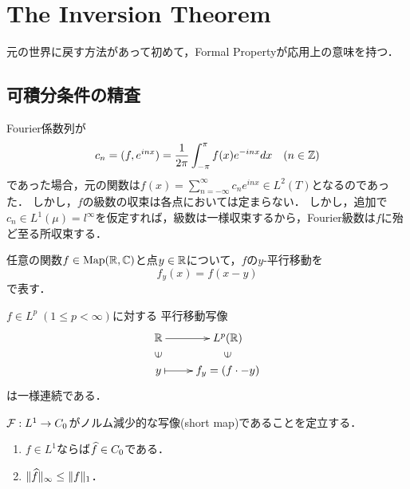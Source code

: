 \documentclass[uplatex,dvipdfmx]{jsreport}
\begin{document}
\section{The Inversion Theorem}

\begin{tcolorbox}[colframe=ForestGreen, colback=ForestGreen!10!white,breakable,colbacktitle=ForestGreen!40!white,coltitle=black,fonttitle=\bfseries\sffamily,
title=]
    元の世界に戻す方法があって初めて，Formal Propertyが応用上の意味を持つ．
\end{tcolorbox}

\subsection{可積分条件の精査}

\begin{discussion}[Fourier級数に関する逆転公式]
    Fourier係数列が
    \[c_n=(f,e^{inx})=\frac{1}{2\pi}\int^\pi_{-\pi}f(x)e^{-inx}dx\quad(n\in\mathbb{Z})\]
    であった場合，元の関数は$f(x)=\sum^\infty_{n=-\infty}c_ne^{inx}\in L^2(T)$となるのであった．
    しかし，$f$の級数の収束は各点においては定まらない．
    しかし，追加で$c_n\in L^1(\mu)=l^\infty$を仮定すれば，級数は一様収束するから，Fourier級数は$f$に殆ど至る所収束する．
\end{discussion}

\begin{notation}
    任意の関数$f\in\mathrm{Map}(\mathbb{R},\mathbb{C})$と点$y\in\mathbb{R}$について，$f$の$y$-平行移動を
    \[f_y(x)=f(x-y)\]
    で表す．
\end{notation}

\begin{lemma}
    $f\in L^p\;(1\le p<\infty)$に対する
    平行移動写像
    \[\xymatrix@R-2pc{
        \R\ar[r]&L^p(\R)\\
        \rotatebox[origin=c]{90}{$\in$}&\rotatebox[origin=c]{90}{$\in$}\\
        y\ar@{|->}[r]&f_y=(f\cdot-y)
    }\]
    は一様連続である．
\end{lemma}

\begin{proposition}
    $\mathcal{F}:L^1\to C_0$がノルム減少的な写像(short map)であることを定立する．
    \begin{enumerate}
        \item $f\in L^1$ならば$\widehat{f}\in C_0$である．
        \item $\|\widehat{f}\|_\infty\le\|f\|_1$．
    \end{enumerate}
\end{proposition}
\end{document}
